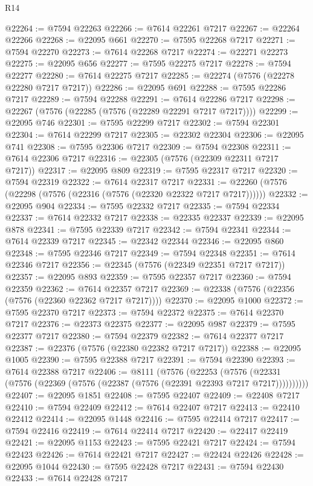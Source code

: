 \begin{lexlean}{R14}
\begin{coremodule}
@22264 := @7594 @22263
@22266 := @7614 @22261 @7217
@22267 := @22264 @22266
@22268 := @22095 @661
@22270 := @7595 @22268 @7217
@22271 := @7594 @22270
@22273 := @7614 @22268 @7217
@22274 := @22271 @22273
@22275 := @22095 @656
@22277 := @7595 @22275 @7217
@22278 := @7594 @22277
@22280 := @7614 @22275 @7217
@22285 := @22274 (@7576 (@22278 @22280 @7217 @7217))
@22286 := @22095 @691
@22288 := @7595 @22286 @7217
@22289 := @7594 @22288
@22291 := @7614 @22286 @7217
@22298 := @22267 (@7576 (@22285 (@7576 (@22289 @22291 @7217 @7217))))
@22299 := @22095 @746
@22301 := @7595 @22299 @7217
@22302 := @7594 @22301
@22304 := @7614 @22299 @7217
@22305 := @22302 @22304
@22306 := @22095 @741
@22308 := @7595 @22306 @7217
@22309 := @7594 @22308
@22311 := @7614 @22306 @7217
@22316 := @22305 (@7576 (@22309 @22311 @7217 @7217))
@22317 := @22095 @809
@22319 := @7595 @22317 @7217
@22320 := @7594 @22319
@22322 := @7614 @22317 @7217
@22331 := @22260 (@7576 (@22298 (@7576 (@22316 (@7576 (@22320 @22322 @7217 @7217))))))
@22332 := @22095 @904
@22334 := @7595 @22332 @7217
@22335 := @7594 @22334
@22337 := @7614 @22332 @7217
@22338 := @22335 @22337
@22339 := @22095 @878
@22341 := @7595 @22339 @7217
@22342 := @7594 @22341
@22344 := @7614 @22339 @7217
@22345 := @22342 @22344
@22346 := @22095 @860
@22348 := @7595 @22346 @7217
@22349 := @7594 @22348
@22351 := @7614 @22346 @7217
@22356 := @22345 (@7576 (@22349 @22351 @7217 @7217))
@22357 := @22095 @893
@22359 := @7595 @22357 @7217
@22360 := @7594 @22359
@22362 := @7614 @22357 @7217
@22369 := @22338 (@7576 (@22356 (@7576 (@22360 @22362 @7217 @7217))))
@22370 := @22095 @1000
@22372 := @7595 @22370 @7217
@22373 := @7594 @22372
@22375 := @7614 @22370 @7217
@22376 := @22373 @22375
@22377 := @22095 @987
@22379 := @7595 @22377 @7217
@22380 := @7594 @22379
@22382 := @7614 @22377 @7217
@22387 := @22376 (@7576 (@22380 @22382 @7217 @7217))
@22388 := @22095 @1005
@22390 := @7595 @22388 @7217
@22391 := @7594 @22390
@22393 := @7614 @22388 @7217
@22406 := @8111
    (@7576
      (@22253
        (@7576 (@22331 (@7576 (@22369 (@7576 (@22387 (@7576 (@22391 @22393 @7217 @7217))))))))))
@22407 := @22095 @1851
@22408 := @7595 @22407
@22409 := @22408 @7217
@22410 := @7594 @22409
@22412 := @7614 @22407 @7217
@22413 := @22410 @22412
@22414 := @22095 @1448
@22416 := @7595 @22414 @7217
@22417 := @7594 @22416
@22419 := @7614 @22414 @7217
@22420 := @22417 @22419
@22421 := @22095 @1153
@22423 := @7595 @22421 @7217
@22424 := @7594 @22423
@22426 := @7614 @22421 @7217
@22427 := @22424 @22426
@22428 := @22095 @1044
@22430 := @7595 @22428 @7217
@22431 := @7594 @22430
@22433 := @7614 @22428 @7217

\end{coremodule}
\end{lexlean}
